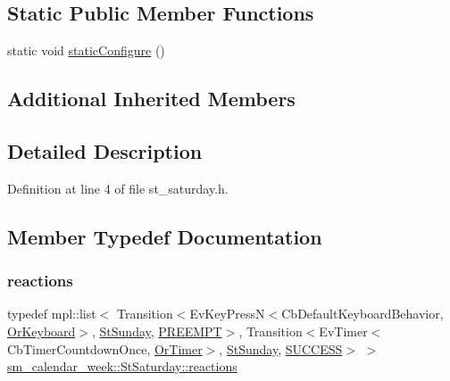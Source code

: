 \subsection*{Static Public Member Functions}
\begin{DoxyCompactItemize}
\item 
static void \hyperlink{structsm__calendar__week_1_1StSaturday_a3cf24c07476dab0e76c90e5d5164bd5a}{static\+Configure} ()
\end{DoxyCompactItemize}
\subsection*{Additional Inherited Members}


\subsection{Detailed Description}


Definition at line 4 of file st\+\_\+saturday.\+h.



\subsection{Member Typedef Documentation}
\mbox{\label{structsm__calendar__week_1_1StSaturday_a8c581c22cf6a32adec475c5caadd4b16}} 
\subsubsection{\texorpdfstring{reactions}{reactions}}
{\footnotesize\ttfamily typedef mpl\+::list$<$ Transition$<$Ev\+Key\+PressN$<$Cb\+Default\+Keyboard\+Behavior, \hyperlink{classsm__calendar__week_1_1OrKeyboard}{Or\+Keyboard}$>$, \hyperlink{structsm__calendar__week_1_1StSunday}{St\+Sunday}, \hyperlink{classPREEMPT}{P\+R\+E\+E\+M\+PT}$>$, Transition$<$Ev\+Timer$<$Cb\+Timer\+Countdown\+Once, \hyperlink{classsm__calendar__week_1_1OrTimer}{Or\+Timer}$>$, \hyperlink{structsm__calendar__week_1_1StSunday}{St\+Sunday}, \hyperlink{classSUCCESS}{S\+U\+C\+C\+E\+SS}$>$ $>$ \hyperlink{structsm__calendar__week_1_1StSaturday_a8c581c22cf6a32adec475c5caadd4b16}{sm\+\_\+calendar\+\_\+week\+::\+St\+Saturday\+::reactions}}



